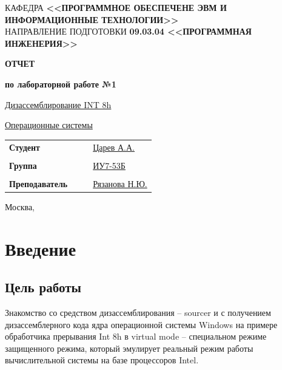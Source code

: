 \documentclass[14pt, a4paper]{article}
\begin{document}
	\noindent
	\small КАФЕДРА {\bf<<ПРОГРАММНОЕ ОБЕСПЕЧЕНЕ ЭВМ И ИНФОРМАЦИОННЫЕ ТЕХНОЛОГИИ>>}\\
	
	\noindent
	\small НАПРАВЛЕНИЕ ПОДГОТОВКИ {\bf 09.03.04 <<ПРОГРАММНАЯ ИНЖЕНЕРИЯ>>}\\
	
	\vspace{3cm}

	\noindent
	\begin{minipage}{\linewidth}
		\centering\large\bf{ОТЧЕТ}

		\centering\bf{по лабораторной работе №1}
	\end{minipage}
	
	\vspace{2cm}
	
	 \underline{Дизассемблирование INT 8h}
	
	\bigbreak
	
	 \underline{Операционные системы}
	
	\vspace{2cm}
	
	\noindent
	\begin{center}
		\begin{tabularx}{\linewidth}{XXXX}
			\bf Студент &&& \underline{Царев А.А.}\\
			&&&\\
			\bf Группа &&& \underline{ИУ7-53Б}\\
			&&&\\
			\bf Преподаватель &&& \underline{Рязанова Н.Ю.}\\
		\end{tabularx}
	
		\vfill
		
		Москва, \the\year
	\end{center}
	
	\pagebreak
		
	\section*{Введение}
	
	\subsection*{Цель работы}
	
	Знакомство со средством дизассемблирования – sourcer и с получением дизассемблерного кода ядра операционной системы Windows на примере обработчика прерывания Int 8h в virtual mode – специальном режиме защищенного режима, который эмулирует реальный режим работы вычислительной системы на базе процессоров Intel.
	
\end{document}
